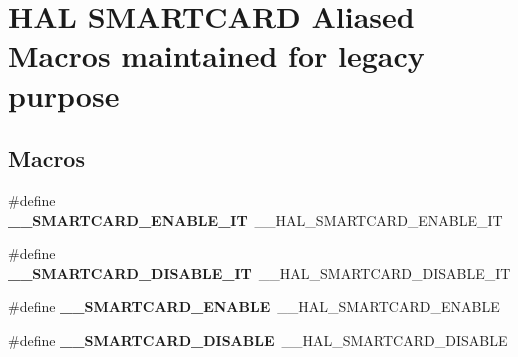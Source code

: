 \hypertarget{group___h_a_l___s_m_a_r_t_c_a_r_d___aliased___macros}{}\section{H\+AL S\+M\+A\+R\+T\+C\+A\+RD Aliased Macros maintained for legacy purpose}
\label{group___h_a_l___s_m_a_r_t_c_a_r_d___aliased___macros}
\subsection*{Macros}
\begin{DoxyCompactItemize}
\item 
\mbox{\label{group___h_a_l___s_m_a_r_t_c_a_r_d___aliased___macros_ga8d5d23bc871cf5aef481120b55f7ac9f}} 
\#define {\bfseries \+\_\+\+\_\+\+S\+M\+A\+R\+T\+C\+A\+R\+D\+\_\+\+E\+N\+A\+B\+L\+E\+\_\+\+IT}~\+\_\+\+\_\+\+H\+A\+L\+\_\+\+S\+M\+A\+R\+T\+C\+A\+R\+D\+\_\+\+E\+N\+A\+B\+L\+E\+\_\+\+IT
\item 
\mbox{\label{group___h_a_l___s_m_a_r_t_c_a_r_d___aliased___macros_ga86c309a6a3c0780c7847062466aaf4cc}} 
\#define {\bfseries \+\_\+\+\_\+\+S\+M\+A\+R\+T\+C\+A\+R\+D\+\_\+\+D\+I\+S\+A\+B\+L\+E\+\_\+\+IT}~\+\_\+\+\_\+\+H\+A\+L\+\_\+\+S\+M\+A\+R\+T\+C\+A\+R\+D\+\_\+\+D\+I\+S\+A\+B\+L\+E\+\_\+\+IT
\item 
\mbox{\label{group___h_a_l___s_m_a_r_t_c_a_r_d___aliased___macros_gaa4e29e98414736502d7ee2371481d9f6}} 
\#define {\bfseries \+\_\+\+\_\+\+S\+M\+A\+R\+T\+C\+A\+R\+D\+\_\+\+E\+N\+A\+B\+LE}~\+\_\+\+\_\+\+H\+A\+L\+\_\+\+S\+M\+A\+R\+T\+C\+A\+R\+D\+\_\+\+E\+N\+A\+B\+LE
\item 
\mbox{\label{group___h_a_l___s_m_a_r_t_c_a_r_d___aliased___macros_ga7765cb32d89b868ca5e775e7b6a571c7}} 
\#define {\bfseries \+\_\+\+\_\+\+S\+M\+A\+R\+T\+C\+A\+R\+D\+\_\+\+D\+I\+S\+A\+B\+LE}~\+\_\+\+\_\+\+H\+A\+L\+\_\+\+S\+M\+A\+R\+T\+C\+A\+R\+D\+\_\+\+D\+I\+S\+A\+B\+LE
\item 
\mbox{\label{group___h_a_l___s_m_a_r_t_c_a_r_d___aliased___macros_ga758ec49e911579f65f7cb03e11cbf1b7}} 

\end{DoxyCompactItemize}
